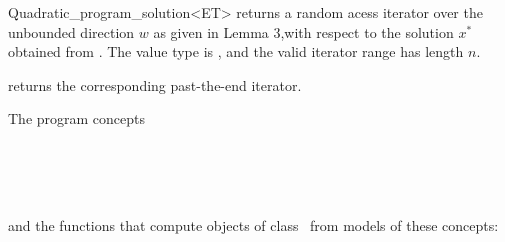 \begin{ccRefClass}{Quadratic_program_solution<ET>}
{returns a random acess iterator over the unbounded direction $w$
as given in Lemma 3,with respect to the solution $x^*$ 
obtained from \ccVar{}. The value type
is , and the valid iterator range has length $n$.
\ccPrecond \ccVar{}}

{returns the corresponding past-the-end iterator.}

\ccSeeAlso

The program concepts 

\\
\\
\\

and the functions that compute objects of class \ccRefName\ from
models of these concepts:

\\
\\
\\
\end{ccRefClass}
